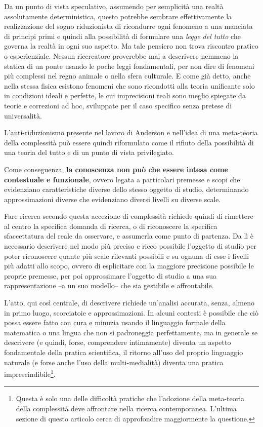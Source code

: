 \documentclass[a4paper, headings=standardclasses]{scrartcl}
\begin{document}
Da un punto di vista speculativo, assumendo per semplicità una realtà assolutamente deterministica, questo potrebbe sembrare effettivamente la realizzazione del sogno riduzionista di ricondurre ogni fenomeno a una manciata di principi primi e quindi alla possibilità di formulare una \textit{legge del tutto} che governa la realtà in ogni suo aspetto. Ma tale pensiero non trova riscontro pratico o esperienziale.
Nessun ricercatore proverebbe mai a descrivere nemmeno la statica di un ponte usando le poche leggi fondamentali, per non dire di fenomeni più complessi nel regno animale o nella sfera culturale.
E come già detto, anche nella stessa fisica esistono fenomeni che sono ricondotti alla teoria unificante solo in condizioni ideali e perfette, le cui imprecisioni reali sono meglio spiegate da teorie e correzioni ad hoc, sviluppate per il caso specifico senza pretese di universalità.

L'anti-riduzionismo presente nel lavoro di Anderson e nell'idea di una meta-teoria della complessità può essere quindi riformulato come il rifiuto della possibilità di una teoria del tutto e di un punto di vista privilegiato.

Come conseguenza, \textbf{la conoscenza non può che essere intesa come contestuale e funzionale}, ovvero legata a particolari premesse e scopi che evidenziano caratteristiche diverse dello stesso oggetto di studio, determinando approssimazioni diverse che evidenziano diversi livelli su diverse scale.

Fare ricerca secondo questa accezione di complessità richiede quindi di rimettere al centro la specifica domanda di ricerca, o di riconoscere la specifica sfaccettatura del reale da osservare, e assumerla come punto di partenza.
Da lì è necessario descrivere nel modo più preciso e ricco possibile l'oggetto di studio per poter riconoscere quante più scale rilevanti possibili e su ognuna di esse i livelli più adatti allo scopo, ovvero di esplicitare con la maggiore precisione possibile le proprie premesse, per poi approssimare l'oggetto di studio a una sua rappresentazione --a un suo modello-- che sia gestibile e affrontabile.

L'atto, qui così centrale, di descrivere richiede un'analisi accurata, senza, almeno in primo luogo, scorciatoie e approssimazioni. In alcuni contesti è possibile che ciò possa essere fatto con cura e minuzia usando il linguaggio formale della matematica o una lingua che non si padroneggia perfettamente, ma in generale se descrivere (e quindi, forse, comprendere intimamente) diventa un aspetto fondamentale della pratica scientifica, il ritorno all'uso del proprio linguaggio naturale (e forse anche l'uso della multi-medialità) diventa una pratica imprescindibile\footnote{Questa è solo una delle difficoltà pratiche che l'adozione della meta-teoria della complessità deve affrontare nella ricerca contemporanea. L'ultima sezione di questo articolo cerca di approfondire maggiormente la questione.}.
\end{document}
